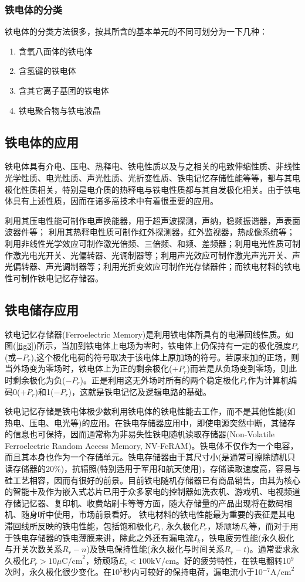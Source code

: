 \documentclass[a4paper]{article}
\begin{document}
\subsubsection{铁电体的分类}
铁电体的分类方法很多，按其所含的基本单元的不同可划分为一下几种：
\begin{enumerate}
    \item 含氧八面体的铁电体
    \item 含氢键的铁电体
    \item 含其它离子基团的铁电体
    \item 铁电聚合物与铁电液晶
\end{enumerate}
\subsection{铁电体的应用}
铁电体具有介电、压电、热释电、铁电性质以及与之相关的电致伸缩性质、非线性光学性质、电光性质、声光性质、光折变性质、铁电记忆存储性能等等，都与其电极化性质相关，特别是电介质的热释电与铁电性质都与其自发极化相关。由于铁电体具有上述性质，因而在诸多高技术中有着很重要的应用。

利用其压电性能可制作电声换能器，用于超声波探测，声纳，稳频振谐器，声表面波器件等； 利用其热释电性质可制作红外探测器，红外监视器，热成像系统等； 利用非线性光学效应可制作激光倍频、三倍频、和频、差频器；利用电光性质可制作激光电光开关、光偏转器、光调制器等；利用声光效应可制作激光声光开关、声光偏转器、声光调制器等；利用光折变效应可制作光存储器件；而铁电材料的铁电性可制作铁电记忆存储器。
\subsection{铁电储存应用}
铁电记忆存储器(Ferroelectric Memory)是利用铁电体所具有的电滞回线性质。如图(\ref{fig3})所示，当加到铁电体上电场为零时，铁电体上仍保持有一定的极化强度$P_r$(或$-P_r$),这个极化电荷的符号取决于该电体上原加场的符号。若原来加的正场，则当外场变为零场时，铁电体上为正的剩余极化($+P_r$)而若是从负场变到零场，则此时剩余极化为负($-P_r$)。正是利用这无外场时所有的两个稳定极化$P_r$作为计算机编码0($+P_r$)和1($-P_r$)，这就是铁电记忆及逻辑电路的基础。

铁电记忆存储是铁电体极少数利用铁电体的铁电性能去工作，而不是其他性能(如热电、压电、电光等)的应用。在铁电存储器应用中，即使电源突然中断，其储存的信息也可保持，因而通常称为非易失性铁电随机读取存储器(Non-Volatile Ferroelectric Random Access Memory, NV-FeRAM)。铁电体不仅作为一个电容，而且其本身也作为一个存储单元。铁电存储器由于其尺寸小(是通常可擦除随机只读存储器的20\%)，抗辐照(特别适用于军用和航天使用)，存储读取速度高，容易与硅工艺相容，因而有很好的前景。目前铁电随机存储器已有商品销售，由其为核心的智能卡及作为嵌入式芯片已用于众多家电的控制器如洗衣机、游戏机、电视频道存储记忆器、复印机、收费站刷卡等等方面，随大存储量的产品出现将在数码相机、随身听中使用，市场前景看好。
铁电材料的铁电性能最为重要的表征是其电滞回线所反映的铁电性能，包括饱和极化$P_s$, 永久极化$P_r$，矫顽场$E_c$等，而对于用于铁电存储器的铁电薄膜来讲，除此之外还有漏电流$I_k$，铁电疲劳性能(永久极化与开关次数关系$R_r-n$)及铁电保持性能(永久极化与时间关系$R_r-t$)。通常要求永久极化$P_r>10\mu \text{C/cm}^2$，矫顽场$E_c<100\text{kV/cm}$。好的疲劳特性，在铁电翻转10$^9$次时，永久极化很少变化。在10$^5$秒内可较好的保持电荷，漏电流小于10$^{-7}\text{A/cm}^2$
\end{document}
